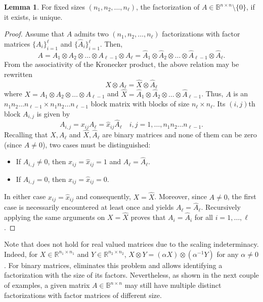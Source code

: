 \documentclass{article}
\numberwithin{equation}{section}
\theoremstyle{definition}
\newtheorem{lemma}[definition]{Lemma}
\begin{document}
\begin{lemma}
\label{lem: uniqueness}
For fixed sizes $(n_1,n_2,\dots,n_\ell)$, the factorization of $A \in \mathbb{B}^{n \times n} \setminus \{0\}$, if it exists, is unique.
\end{lemma}
\begin{proof}
Assume that $A$ admits two $(n_1,n_2,\dots,n_\ell)$ factorizations with factor matrices $\{A_i\}_{i=1}^\ell$ and $\{\hat{A}_i\}_{i=1}^\ell$. Then,
\begin{equation*}
    A = A_1 \otimes A_2 \otimes \dots \otimes A_{\ell-1} \otimes A_\ell = \hat{A}_1 \otimes \hat{A}_2 \otimes \dots \otimes \hat{A}_{\ell-1} \otimes \hat{A}_\ell.
\end{equation*}
From the associativity of the Kronecker product, the above relation may be rewritten
\begin{equation*}
    X \otimes A_\ell = \hat{X} \otimes \hat{A}_\ell
\end{equation*}
where $X=A_1 \otimes A_2 \otimes \dots \otimes A_{\ell-1}$ and $\hat{X}=\hat{A}_1 \otimes \hat{A}_2 \otimes \dots \otimes \hat{A}_{\ell-1}$. Thus, $A$ is an $n_1n_2 \dots n_{\ell-1} \times n_1n_2 \dots n_{\ell-1}$ block matrix with blocks of size $n_\ell \times n_\ell$. Its $(i,j)$th block $A_{i,j}$ is given by
\begin{equation*}
    A_{i,j} = x_{ij}A_\ell = \hat{x}_{ij}\hat{A}_\ell \quad i,j=1,\dots,n_1n_2 \dots n_{\ell-1}.
\end{equation*}
Recalling that $X,A_\ell$ and $\hat{X},\hat{A}_\ell$ are binary matrices and none of them can be zero (since $A \neq 0$), two cases must be distinguished:
\begin{itemize}[noitemsep]
    \item If $A_{i,j} \neq 0$, then $x_{ij}=\hat{x}_{ij}=1$ and $A_\ell=\hat{A}_\ell$.
    \item If $A_{i,j} = 0$, then $x_{ij}=\hat{x}_{ij}=0$.
\end{itemize}
In either case $x_{ij}=\hat{x}_{ij}$ and consequently, $X=\hat{X}$. Moreover, since $A \neq 0$, the first case is necessarily encountered at least once and yields $A_\ell=\hat{A}_\ell$. Recursively applying the same arguments on $X=\hat{X}$ proves that $A_i=\hat{A}_i$ for all $i=1,\dots,\ell$.
\end{proof}

Note that  does not hold for real valued matrices due to the scaling indeterminacy. Indeed, for $X \in \mathbb{R}^{n_1 \times n_1}$ and $Y \in \mathbb{R}^{n_2 \times n_2}$, $X \otimes Y = (\alpha X) \otimes (\alpha^{-1}Y)$ for any $\alpha \neq 0$. For binary matrices,  eliminates this problem and allows identifying a factorization with the size of its factors. Nevertheless, as shown in the next couple of examples, a given matrix $A \in \mathbb{B}^{n \times n}$ may still have multiple distinct factorizations with factor matrices of different size.
\end{document}
